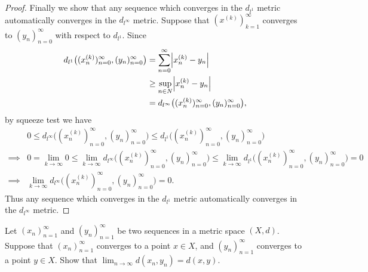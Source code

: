 \begin{proof}
    Finally we show that any sequence which converges in the \(d_{l^1}\) metric automatically converges in the \(d_{l^\infty}\) metric.
    Suppose that \((x^{(k)})_{k = 1}^\infty\) converges to \((y_n)_{n = 0}^\infty\) with respect to \(d_{l^1}\).
    Since
    \begin{align*}
        d_{l^1}\big((x_n^{(k)})_{n = 0}^\infty, (y_n)_{n = 0}^\infty\big) & = \sum_{n = 0}^\infty \abs*{x_n^{(k)} - y_n}                              \\
                                                                          & \geq \sup_{n \in N} \abs*{x_n^{(k)} - y_n}                                \\
                                                                          & = d_{l^\infty}\big((x_n^{(k)})_{n = 0}^\infty, (y_n)_{n = 0}^\infty\big),
    \end{align*}
    by squeeze test we have
    \begin{align*}
                 & 0 \leq d_{l^\infty}\big((x_n^{(k)})_{n = 0}^\infty, (y_n)_{n = 0}^\infty\big) \leq d_{l^1}\big((x_n^{(k)})_{n = 0}^\infty, (y_n)_{n = 0}^\infty\big)                                                                     \\
        \implies & 0 = \lim_{k \to \infty} 0 \leq \lim_{k \to \infty} d_{l^\infty}\big((x_n^{(k)})_{n = 0}^\infty, (y_n)_{n = 0}^\infty\big) \leq \lim_{k \to \infty} d_{l^1}\big((x_n^{(k)})_{n = 0}^\infty, (y_n)_{n = 0}^\infty\big) = 0 \\
        \implies & \lim_{k \to \infty} d_{l^\infty}\big((x_n^{(k)})_{n = 0}^\infty, (y_n)_{n = 0}^\infty\big) = 0.
    \end{align*}
    Thus any sequence which converges in the \(d_{l^1}\) metric automatically converges in the \(d_{l^\infty}\) metric.
\end{proof}

\begin{exercise}\label{ex 1.1.16}
    Let \((x_n)_{n = 1}^\infty\) and \((y_n)_{n = 1}^\infty\) be two sequences in a metric space \((X, d)\).
    Suppose that \((x_n)_{n = 1}^\infty\) converges to a point \(x \in X\), and \((y_n)_{n = 1}^\infty\) converges to a point \(y \in X\).
    Show that \(\lim_{n \to \infty} d(x_n, y_n) = d(x, y)\).
\end{exercise}

